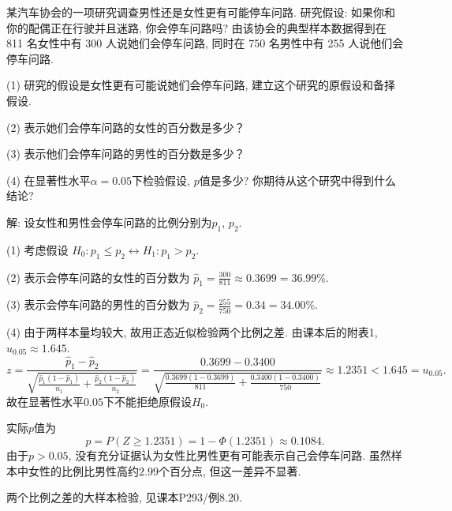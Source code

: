 \documentclass[standard]{ExBook}
\providecommand{\kaishu}{}
\renewcommand{\kaishu}{\CJKfamily{zhkai}}
\renewenvironment{shaded}{%
  \def\FrameCommand{\fboxsep=\FrameSep \colorbox{shadecolor}}%
  \MakeFramed{\advance\hsize-\width \FrameRestore}%
}{%
  \endMakeFramed
}
\begin{document}
\begin{qitems}
    \begin{bbox}
    \begin{shaded}
        \qitem
某汽车协会的一项研究调查男性还是女性更有可能停车问路. 研究假设: 如果你和你的配偶正在行驶并且迷路, 你会停车问路吗? 由该协会的典型样本数据得到在 811 名女性中有 300 人说她们会停车问路, 同时在 750 名男性中有 255 人说他们会停车问路.

(1) 研究的假设是女性更有可能说她们会停车问路, 建立这个研究的原假设和备择假设.

(2) 表示她们会停车问路的女性的百分数是多少？

(3) 表示他们会停车问路的男性的百分数是多少？

(4) 在显著性水平$\alpha=0.05$下检验假设, $p$值是多少? 你期待从这个研究中得到什么结论?
    \end{shaded}
    \end{bbox}

\vspace{\dimexpr2.5cm-5em\relax}

解: 设女性和男性会停车问路的比例分别为$p_1$, $p_2$.

(1) 考虑假设
$
H_0:p_1\leq p_2
\longleftrightarrow
H_1:p_1>p_2
$.

(2) 表示会停车问路的女性的百分数为
$
\hat{p}_1=\frac{300}{811}\approx0.3699=36.99\%
$.

(3) 表示会停车问路的男性的百分数为
$
\hat{p}_2=\frac{255}{750}=0.34=34.00\%
$.

(4) 由于两样本量均较大, 故用正态近似检验两个比例之差. 由课本后的附表1, $u_{0.05}\approx1.645$.
$$
z
=
\frac{\hat{p}_1-\hat{p}_2}
{\sqrt{\frac{\hat{p}_1(1-\hat{p}_1)}{n_1}
+\frac{\hat{p}_2(1-\hat{p}_2)}{n_2}}}
=
\frac{0.3699-0.3400}
{\sqrt{\frac{0.3699(1-0.3699)}{811}
+\frac{0.3400(1-0.3400)}{750}}}
\approx1.2351
<
1.645
=
u_{0.05}.
$$
故在显著性水平$0.05$下不能拒绝原假设$H_0$.

实际$p$值为
$$
p
=
P(Z\geq1.2351)
=
1-\Phi(1.2351)
\approx0.1084.
$$
由于$p>0.05$, 没有充分证据认为女性比男性更有可能表示自己会停车问路. 虽然样本中女性的比例比男性高约$2.99$个百分点, 但这一差异不显著.

\textcolor{themeColor}{\selectfont {} 两个比例之差的大样本检验, 见课本P293/例8.20.}

\end{qitems}


\section{\kaishu{非参数假设检验}}
\end{document}
